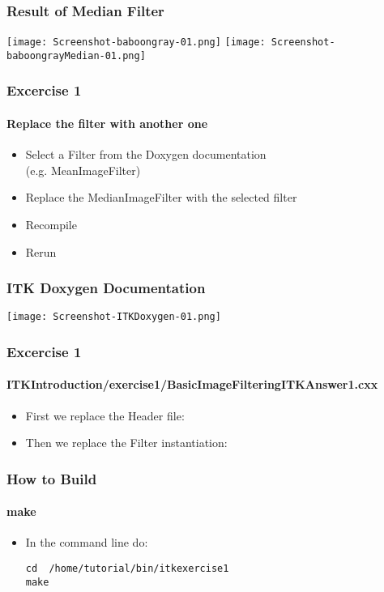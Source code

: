\begin{frame}[fragile]
\frametitle{Result of Median Filter}
\begin{center}
  \texttt{[image: Screenshot-baboongray-01.png]}
  \texttt{[image: Screenshot-baboongrayMedian-01.png]}
\end{center}
\end{frame}

\begin{frame}[fragile]
\frametitle{Excercise 1}
\framesubtitle{Replace the filter with another one}
\begin{itemize}
\item Select a Filter from the Doxygen documentation\\
(e.g. MeanImageFilter)
\item Replace the MedianImageFilter with the selected filter
\item Recompile
\item Rerun
\end{itemize}
\end{frame}

\begin{frame}[fragile]
\frametitle{ITK Doxygen Documentation}
\begin{center}
  \texttt{[image: Screenshot-ITKDoxygen-01.png]}
\end{center}
\end{frame}

\begin{frame}
\frametitle{Excercise 1}
\framesubtitle{ITKIntroduction/exercise1/BasicImageFilteringITKAnswer1.cxx}
\begin{itemize}
\item First we replace the Header file:
\end{itemize}
\begin{itemize}
\item Then we replace the Filter instantiation:
\end{itemize}
\end{frame}

\begin{frame}[fragile]
\frametitle{How to Build}
\framesubtitle{make}
\begin{itemize}
\item In the command line do:
\begin{verbatim}
cd  /home/tutorial/bin/itkexercise1
make
\end{verbatim}
\end{itemize}
\end{frame}

